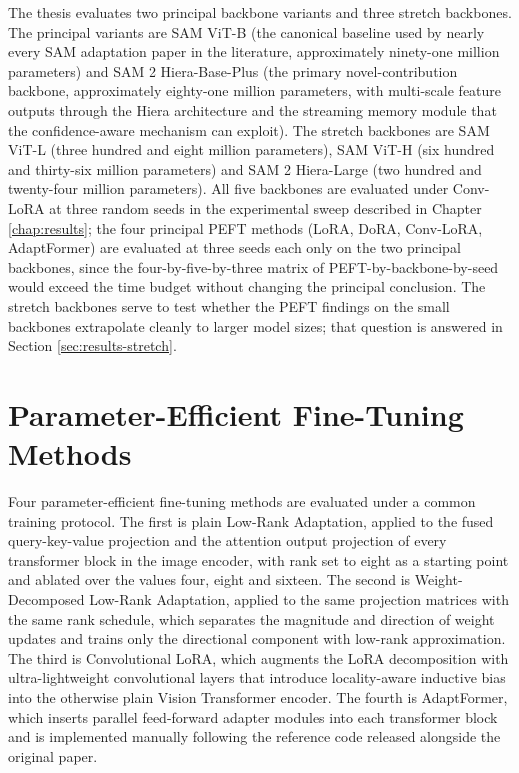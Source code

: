 \documentclass[11pt,a4paper,oneside]{report}
\begin{document}
The thesis evaluates two principal backbone variants and three stretch backbones. The principal variants are SAM ViT-B (the canonical baseline used by nearly every SAM adaptation paper in the literature, approximately ninety-one million parameters) and SAM 2 Hiera-Base-Plus (the primary novel-contribution backbone, approximately eighty-one million parameters, with multi-scale feature outputs through the Hiera architecture and the streaming memory module that the confidence-aware mechanism can exploit). The stretch backbones are SAM ViT-L (three hundred and eight million parameters), SAM ViT-H (six hundred and thirty-six million parameters) and SAM 2 Hiera-Large (two hundred and twenty-four million parameters). All five backbones are evaluated under Conv-LoRA at three random seeds in the experimental sweep described in Chapter \ref{chap:results}; the four principal PEFT methods (LoRA, DoRA, Conv-LoRA, AdaptFormer) are evaluated at three seeds each only on the two principal backbones, since the four-by-five-by-three matrix of PEFT-by-backbone-by-seed would exceed the time budget without changing the principal conclusion. The stretch backbones serve to test whether the PEFT findings on the small backbones extrapolate cleanly to larger model sizes; that question is answered in Section \ref{sec:results-stretch}.

\section{Parameter-Efficient Fine-Tuning Methods}

Four parameter-efficient fine-tuning methods are evaluated under a common training protocol. The first is plain Low-Rank Adaptation, applied to the fused query-key-value projection and the attention output projection of every transformer block in the image encoder, with rank set to eight as a starting point and ablated over the values four, eight and sixteen. The second is Weight-Decomposed Low-Rank Adaptation, applied to the same projection matrices with the same rank schedule, which separates the magnitude and direction of weight updates and trains only the directional component with low-rank approximation. The third is Convolutional LoRA, which augments the LoRA decomposition with ultra-lightweight convolutional layers that introduce locality-aware inductive bias into the otherwise plain Vision Transformer encoder. The fourth is AdaptFormer, which inserts parallel feed-forward adapter modules into each transformer block and is implemented manually following the reference code released alongside the original paper.
\end{document}
